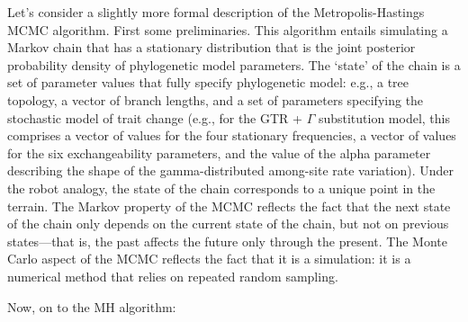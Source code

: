 \documentclass[11pt]{article}
\begin{document}
Let’s consider a slightly more formal description of the Metropolis-Hastings MCMC algorithm. First some preliminaries. This algorithm entails simulating a Markov chain that has a stationary distribution that is the joint posterior probability density of phylogenetic model parameters. The `state’ of the chain is a set of parameter values that fully specify phylogenetic model: e.g., a tree topology, a vector of branch lengths, and a set of parameters specifying the stochastic model of trait change (e.g., for the GTR + $\Gamma$  substitution model, this comprises a vector of values for the four stationary frequencies, a vector of values for the six exchangeability parameters, and the value of the alpha parameter describing the shape of the gamma-distributed among-site rate variation). Under the robot analogy, the state of the chain corresponds to a unique point in the terrain. The Markov property of the MCMC reflects the fact that the next state of the chain only depends on the current state of the chain, but not on previous states—that is, the past affects the future only through the present. The Monte Carlo aspect of the MCMC reflects the fact that it is a simulation: it is a numerical method that relies on repeated random sampling.

Now, on to the MH algorithm:
\end{document}

